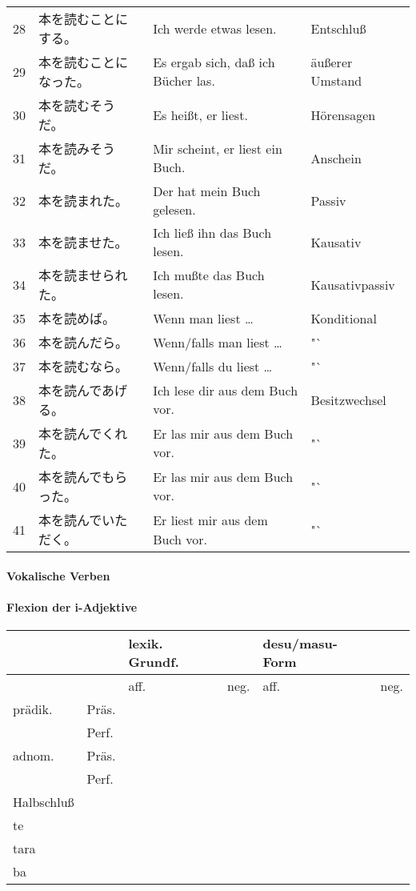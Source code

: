 \documentclass[justified, a4paper, notitlepage, captions=tableheading, nobib]{tufte-handout}
\begin{document}
\begin{tabular}{rlll}
28 & 本を読むことにする。 & Ich werde etwas lesen. & Entschluß\\
29 & 本を読むことになった。 & Es ergab sich, daß ich Bücher las. & äußerer Umstand\\
30 & 本を読むそうだ。 & Es heißt, er liest. & Hörensagen\\
31 & 本を読みそうだ。 & Mir scheint, er liest ein Buch. & Anschein\\
32 & 本を読まれた。 & Der hat mein Buch gelesen. & Passiv\\
33 & 本を読ませた。 & Ich ließ ihn das Buch lesen. & Kausativ\\
34 & 本を読ませられた。 & Ich mußte das Buch lesen. & Kausativpassiv\\
35 & 本を読めば。 & Wenn man liest \ldots{} & Konditional\\
36 & 本を読んだら。 & Wenn/falls man liest \ldots{} & "`\\
37 & 本を読むなら。 & Wenn/falls du liest \ldots{} & "`\\
38 & 本を読んであげる。 & Ich lese dir aus dem Buch vor. & Besitzwechsel\\
39 & 本を読んでくれた。 & Er las mir aus dem Buch vor. & "`\\
40 & 本を読んでもらった。 & Er las mir aus dem Buch vor. & "`\\
41 & 本を読んでいただく。 & Er liest mir aus dem Buch vor.　 & "`\\
\end{tabular}

\paragraph{Vokalische Verben}
\label{sec:org0e5dfe1}

\paragraph{Flexion der i-Adjektive}
\label{sec:org40488da}

\begin{tabular}{llllll}
 &  & lexik. Grundf. &  & desu/masu-Form & \\
\hline
 &  & aff. & neg. & aff. & neg.\\
\hline
prädik. & Präs. &  &  &  & \\
 & Perf. &  &  &  & \\
adnom. & Präs. &  &  &  & \\
 & Perf. &  &  &  & \\
Halbschluß &  &  &  &  & \\
te &  &  &  &  & \\
tara &  &  &  &  & \\
ba &  &  &  &  & \\
\end{tabular}
\end{document}
